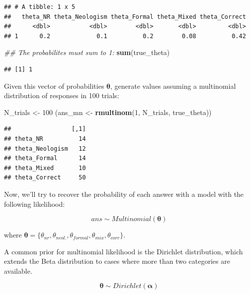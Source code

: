 \documentclass[12pt,]{krantz}
\newenvironment{Shaded}{\begin{snugshade}}{\end{snugshade}}
\newcommand{\CommentTok}[1]{\textcolor[rgb]{0.56,0.35,0.01}{\textit{#1}}}
\newcommand{\DecValTok}[1]{\textcolor[rgb]{0.00,0.00,0.81}{#1}}
\newcommand{\KeywordTok}[1]{\textcolor[rgb]{0.13,0.29,0.53}{\textbf{#1}}}
\newcommand{\NormalTok}[1]{#1}
\newcommand{\StringTok}[1]{\textcolor[rgb]{0.31,0.60,0.02}{#1}}
\theoremstyle{definition}
\theoremstyle{definition}
\theoremstyle{definition}
\theoremstyle{remark}
\begin{document}
\begin{verbatim}
## # A tibble: 1 x 5
##   theta_NR theta_Neologism theta_Formal theta_Mixed theta_Correct
##      <dbl>           <dbl>        <dbl>       <dbl>         <dbl>
## 1      0.2             0.1          0.2        0.08          0.42
\end{verbatim}

\begin{Shaded}
\begin{Highlighting}[]
\CommentTok{## The probabilites must sum to 1:}
\KeywordTok{sum}\NormalTok{(true_theta)}
\end{Highlighting}
\end{Shaded}

\begin{verbatim}
## [1] 1
\end{verbatim}

Given this vector of probabilities \(\boldsymbol{\theta}\), generate values assuming a multinomial distribution of responses in 100 trials:

\begin{Shaded}
\begin{Highlighting}[]
\NormalTok{N_trials <-}\StringTok{ }\DecValTok{100}
\NormalTok{(ans_mn <-}\StringTok{ }\KeywordTok{rmultinom}\NormalTok{(}\DecValTok{1}\NormalTok{, N_trials, true_theta))}
\end{Highlighting}
\end{Shaded}

\begin{verbatim}
##                 [,1]
## theta_NR          14
## theta_Neologism   12
## theta_Formal      14
## theta_Mixed       10
## theta_Correct     50
\end{verbatim}

Now, we'll try to recover the probability of each answer with a model with the following likelihood:

\begin{equation}
ans \sim Multinomial(\boldsymbol{\theta})
\end{equation}

where \(\boldsymbol{\theta} = \{\theta_{nr}, \theta_{neol.}, \theta_{formal}, \theta_{mix}, \theta_{corr}\}\).

A common prior for multinomial likelihood is the Dirichlet distribution, which extends the Beta distribution to cases where more than two categories are available.

\begin{equation}
\boldsymbol{\theta} \sim Dirichlet(\boldsymbol{\alpha})
\end{equation}
\end{document}
